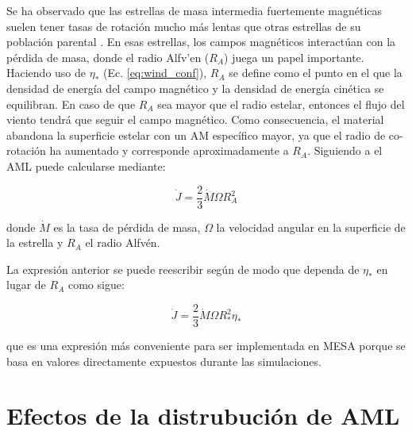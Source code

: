 Se ha observado que las estrellas de masa intermedia fuertemente magnéticas suelen tener tasas de rotación mucho más lentas que otras estrellas de su población parental \cite{Mathys2006}. En esas estrellas, los campos magnéticos interactúan con la pérdida de masa, donde el radio Alfv'{e}n ($R_{A}$) juega un papel importante. Haciendo uso de $\eta_*$ (Ec. \ref{eq:wind_conf}), $R_{A}$ se define como el punto en el que la densidad de energía del campo magnético y la densidad de energía cinética se equilibran. En caso de que $R_{A}$ sea mayor que el radio estelar, entonces el flujo del viento tendrá que seguir el campo magnético. Como consecuencia, el material abandona la superficie estelar con un AM específico mayor, ya que el radio de co-rotación ha aumentado y corresponde aproximadamente a $R_{A}$. Siguiendo a \cite{Weber1967} el AML puede calcularse mediante:

\begin{ceqn}
\begin{equation}
 \Dot{J} = \frac{2}{3} \Dot{M}\Omega R^{2}_{A} \label{eq:j_dot}
\end{equation}
\end{ceqn}

donde $\Dot{M}$ es la tasa de pérdida de masa, $\Omega$ la velocidad angular en la superficie de la estrella y $R_A$ el radio Alfv\'{e}n. \par

La expresión anterior se puede reescribir según \cite{Ud-Doula2008} de modo que dependa de $\eta_*$ en lugar de $R_A$ como sigue:

\begin{ceqn}
\begin{equation}
 \Dot{J} = \frac{2}{3} \Dot{M}\Omega R^{2}_{*}\eta_* \label{eq:j_dot_mesa}
\end{equation}

\end{ceqn}
que es una expresión más conveniente para ser implementada en MESA porque se basa en valores directamente expuestos durante las simulaciones.



\section{Efectos de la distrubución de AML}
